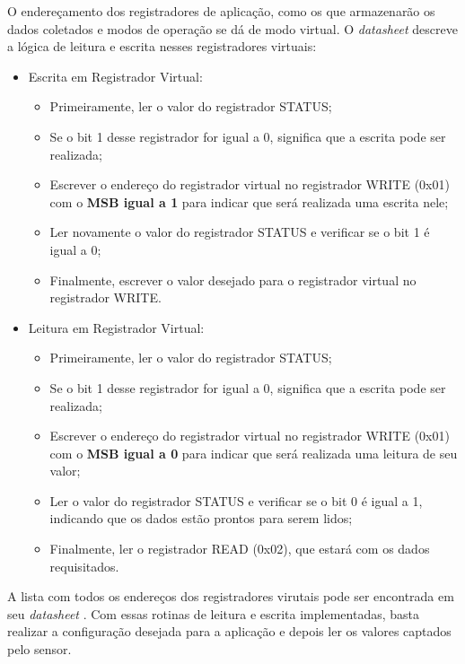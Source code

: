 \documentclass[../monografia.tex]{subfiles}
\begin{document}
O endereçamento dos registradores de aplicação, como os que armazenarão os dados coletados e modos de operação se dá de modo virtual. O \textit{datasheet} descreve a lógica de leitura e escrita nesses registradores virtuais:

\begin{itemize}
\item Escrita em Registrador Virtual:
	\begin{itemize}
		\item Primeiramente, ler o valor do registrador STATUS;
		\item Se o bit 1 desse registrador for igual a 0, significa que a escrita pode ser realizada;
		\item Escrever o endereço do registrador virtual no registrador WRITE (0x01) com o \textbf{MSB igual a 1} para indicar que será realizada uma escrita nele;
		\item Ler novamente o valor do registrador STATUS e verificar se o bit 1 é igual a 0;
		\item Finalmente, escrever o valor desejado para o registrador virtual no registrador WRITE.
	\end{itemize}
	
\item Leitura em Registrador Virtual:
	\begin{itemize}
		\item Primeiramente, ler o valor do registrador STATUS;
		\item Se o bit 1 desse registrador for igual a 0, significa que a escrita pode ser realizada;
		\item Escrever o endereço do registrador virtual no registrador WRITE (0x01) com o \textbf{MSB igual a 0} para indicar que será realizada uma leitura de seu valor;
		\item Ler o valor do registrador STATUS e verificar se o bit 0 é igual a 1, indicando que os dados estão prontos para serem lidos;
		\item Finalmente, ler o registrador READ (0x02), que estará com os dados requisitados.
	\end{itemize}
\end{itemize}

A lista com todos os endereços dos registradores virutais pode ser encontrada em seu \textit{datasheet} \cite{as7262}. Com essas rotinas de leitura e escrita implementadas, basta realizar a configuração desejada para a aplicação e depois ler os valores captados pelo sensor. 
\end{document}
